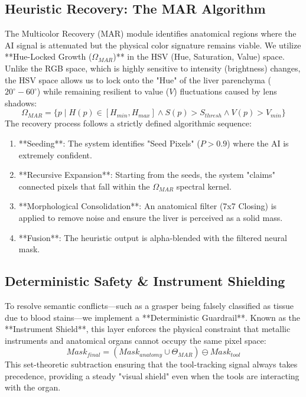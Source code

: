\documentclass[conference]{IEEEtran}
\begin{document}
\subsection{Heuristic Recovery: The MAR Algorithm}
The Multicolor Recovery (MAR) module identifies anatomical regions where the AI signal is attenuated but the physical color signature remains viable. We utilize **Hue-Locked Growth ($\Omega_{MAR}$)** in the HSV (Hue, Saturation, Value) space. Unlike the RGB space, which is highly sensitive to intensity (brightness) changes, the HSV space allows us to lock onto the "Hue" of the liver parenchyma ($20^\circ-60^\circ$) while remaining resilient to value ($V$) fluctuations caused by lens shadows:
\begin{equation}
\Omega_{MAR} = \{ p \mid H(p) \in [H_{min}, H_{max}] \land S(p) > S_{thresh} \land V(p) > V_{min} \}
\end{equation}
The recovery process follows a strictly defined algorithmic sequence:
\begin{enumerate}
    \item **Seeding**: The system identifies "Seed Pixels" ($P>0.9$) where the AI is extremely confident.
    \item **Recursive Expansion**: Starting from the seeds, the system "claims" connected pixels that fall within the $\Omega_{MAR}$ spectral kernel.
    \item **Morphological Consolidation**: An anatomical filter (7x7 Closing) is applied to remove noise and ensure the liver is perceived as a solid mass.
    \item **Fusion**: The heuristic output is alpha-blended with the filtered neural mask.
\end{enumerate}

\subsection{Deterministic Safety & Instrument Shielding}
To resolve semantic conflicts—such as a grasper being falsely classified as tissue due to blood stains—we implement a **Deterministic Guardrail**. Known as the **Instrument Shield**, this layer enforces the physical constraint that metallic instruments and anatomical organs cannot occupy the same pixel space:
\begin{equation}
Mask_{final} = (Mask_{anatomy} \cup \Theta_{MAR}) \ominus Mask_{tool}
\end{equation}
This set-theoretic subtraction ensuring that the tool-tracking signal always takes precedence, providing a steady "visual shield" even when the tools are interacting with the organ.
\end{document}
